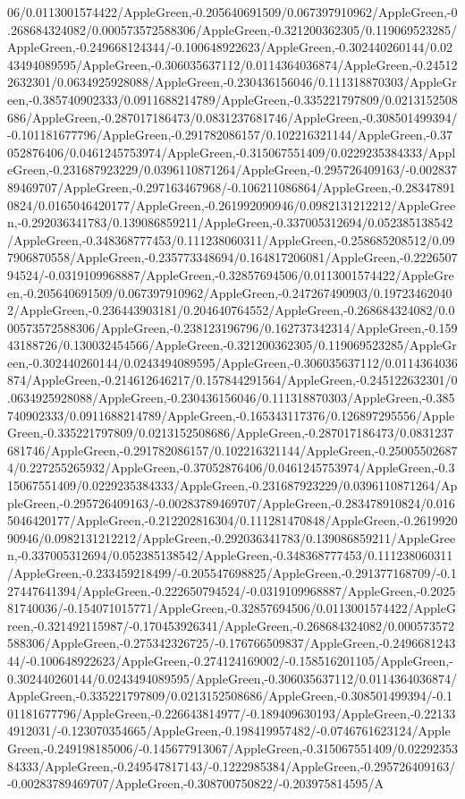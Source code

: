 {\begin{tikzternal}
{06/0.0113001574422/AppleGreen,-0.205640691509/0.067397910962/AppleGreen,-0.268684324082/0.000573572588306/AppleGreen,-0.321200362305/0.119069523285/AppleGreen,-0.249668124344/-0.100648922623/AppleGreen,-0.302440260144/0.0243494089595/AppleGreen,-0.306035637112/0.0114364036874/AppleGreen,-0.245122632301/0.0634925928088/AppleGreen,-0.230436156046/0.111318870303/AppleGreen,-0.385740902333/0.0911688214789/AppleGreen,-0.335221797809/0.0213152508686/AppleGreen,-0.287017186473/0.0831237681746/AppleGreen,-0.308501499394/-0.101181677796/AppleGreen,-0.291782086157/0.102216321144/AppleGreen,-0.37052876406/0.0461245753974/AppleGreen,-0.315067551409/0.0229235384333/AppleGreen,-0.231687923229/0.0396110871264/AppleGreen,-0.295726409163/-0.00283789469707/AppleGreen,-0.297163467968/-0.106211086864/AppleGreen,-0.283478910824/0.0165046420177/AppleGreen,-0.261992090946/0.0982131212212/AppleGreen,-0.292036341783/0.139086859211/AppleGreen,-0.337005312694/0.052385138542/AppleGreen,-0.348368777453/0.111238060311/AppleGreen,-0.258685208512/0.097906870558/AppleGreen,-0.235773348694/0.164817206081/AppleGreen,-0.222650794524/-0.0319109968887/AppleGreen,-0.32857694506/0.0113001574422/AppleGreen,-0.205640691509/0.067397910962/AppleGreen,-0.247267490903/0.197234620402/AppleGreen,-0.236443903181/0.204640764552/AppleGreen,-0.268684324082/0.000573572588306/AppleGreen,-0.238123196796/0.162737342314/AppleGreen,-0.15943188726/0.130032454566/AppleGreen,-0.321200362305/0.119069523285/AppleGreen,-0.302440260144/0.0243494089595/AppleGreen,-0.306035637112/0.0114364036874/AppleGreen,-0.214612646217/0.157844291564/AppleGreen,-0.245122632301/0.0634925928088/AppleGreen,-0.230436156046/0.111318870303/AppleGreen,-0.385740902333/0.0911688214789/AppleGreen,-0.165343117376/0.126897295556/AppleGreen,-0.335221797809/0.0213152508686/AppleGreen,-0.287017186473/0.0831237681746/AppleGreen,-0.291782086157/0.102216321144/AppleGreen,-0.250055026874/0.227255265932/AppleGreen,-0.37052876406/0.0461245753974/AppleGreen,-0.315067551409/0.0229235384333/AppleGreen,-0.231687923229/0.0396110871264/AppleGreen,-0.295726409163/-0.00283789469707/AppleGreen,-0.283478910824/0.0165046420177/AppleGreen,-0.212202816304/0.111281470848/AppleGreen,-0.261992090946/0.0982131212212/AppleGreen,-0.292036341783/0.139086859211/AppleGreen,-0.337005312694/0.052385138542/AppleGreen,-0.348368777453/0.111238060311/AppleGreen,-0.233459218499/-0.205547698825/AppleGreen,-0.291377168709/-0.127447641394/AppleGreen,-0.222650794524/-0.0319109968887/AppleGreen,-0.202581740036/-0.154071015771/AppleGreen,-0.32857694506/0.0113001574422/AppleGreen,-0.321492115987/-0.170453926341/AppleGreen,-0.268684324082/0.000573572588306/AppleGreen,-0.275342326725/-0.176766509837/AppleGreen,-0.249668124344/-0.100648922623/AppleGreen,-0.274124169002/-0.158516201105/AppleGreen,-0.302440260144/0.0243494089595/AppleGreen,-0.306035637112/0.0114364036874/AppleGreen,-0.335221797809/0.0213152508686/AppleGreen,-0.308501499394/-0.101181677796/AppleGreen,-0.226643814977/-0.189409630193/AppleGreen,-0.221334912031/-0.123070354665/AppleGreen,-0.198419957482/-0.0746761623124/AppleGreen,-0.249198185006/-0.145677913067/AppleGreen,-0.315067551409/0.0229235384333/AppleGreen,-0.249547817143/-0.1222985384/AppleGreen,-0.295726409163/-0.00283789469707/AppleGreen,-0.308700750822/-0.203975814595/A}
\end{tikzternal}}

